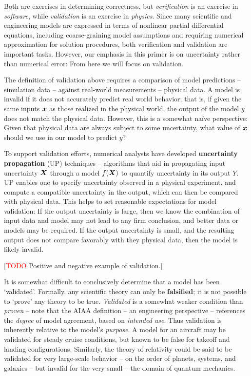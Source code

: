 \documentclass[../primer.tex]{subfiles}
\begin{document}
Both are exercises in determining correctness, but \emph{verification} is an
exercise in \emph{software}, while \emph{validation} is an exercise in
\emph{physics}. Since many scientific and engineering models are expressed in
terms of nonlinear partial differential equations, including coarse-graining
model assumptions and requiring numerical approximation for solution procedures,
both verification and validation are important tasks. However, our emphasis in
this primer is on uncertainty rather than numerical error: From here we will
focus on validation.

The definition of validation above requires a comparison of model predictions --
simulation data -- against real-world measurements -- physical data. A model is
invalid if it does not accurately predict real world behavior; that is, if given
the same inputs $\boldsymbol{x}$ as those realized in the physical world, the output of the
model $y$ does not match the physical data. However, this is a somewhat na\"ive
perspective: Given that physical data are always subject to some uncertainty,
what value of $\boldsymbol{x}$ should we use in our model to predict $y$?

To support validation efforts, numerical analysts have developed
\textbf{uncertainty propagation} (UP) techniques -- algorithms that aid in
propagating input uncertainty $\boldsymbol{X}$ through a model $f(\boldsymbol{X})$ to quantify
uncertainty in its output $Y$. UP enables one to specify uncertainty observed in
a physical experiment, and compute a compatible uncertainty in the output, which
can then be compared with physical data. This helps to set reasonable
expectations for model validation: If the output uncertainty is large, then we
know the combination of input data and model may not lead to any firm
conclusion, and better data or models may be required. If the output uncertainty
is small, and the resulting output does not compare favorably with they physical
data, then the model is likely invalid.

[\textcolor{red}{TODO} Positive and negative example of validation.]

It is somewhat difficult to conclusively determine that a model has been
`validated'. Formally, any scientific theory can only be \textbf{falsified}; it
is not possible to `prove' any theory to be true.\cite{popper2005logic}
\emph{Validated} is a somewhat weaker condition than \emph{proven} -- note that
the AIAA definition -- an engineering perspective -- references the
\emph{degree} of model agreement, based on \emph{intended use}. Thus validation
is inherently relative to the model's \emph{purpose}. A model for an aircraft
may be validated for steady cruise conditions, but known to be false for takeoff
and landing configurations. Similarly, the theory of relativity could be said to
be validated for very large-scale behavior -- on the order of planets, systems,
and galaxies -- but invalid for the very small -- the domain of quantum
mechanics.
\end{document}
